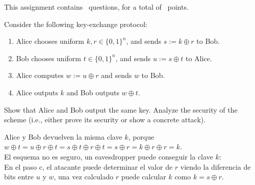 \documentclass[12pt,addpoints,answers]{exam}
\begin{document}
\noindent This assignment contains \numquestions\ questions,
for a total of \numpoints \ points.

\bigskip

\begin{questions}

\question[10] Consider the following key-exchange protocol:
\begin{enumerate}[label=(\alph*)]
    \item Alice chooses uniform $k,r\in\{0,1\}^n$, and sends $s:=k\oplus r$ to Bob.
    \item Bob chooses uniform $t\in\{0,1\}^n$, and sends $u:=s\oplus t$ to Alice.
    \item Alice computes $w:=u\oplus r$ and sends $w$ to Bob.
    \item Alice outputs $k$ and Bob outputs $w\oplus t$.
\end{enumerate}
Show that Alice and Bob output the same key. Analyze the security of the scheme (i.e., either prove its security or show a concrete attack).
\begin{solution}
    Alice y Bob devuelven la misma clave $k$, porque $w \oplus t = u \oplus r \oplus t = s \oplus t \oplus r \oplus t = s \oplus r = k \oplus r \oplus r = k$. \\ 
    El esquema no es seguro, un eavesdropper puede conseguir la clave $k$: \\ 
    En el paso c, el atacante puede determinar el valor de $r$ viendo la diferencia de bits entre $u$ y $w$, una vez calculado $r$ puede calcular $k$ como $k = s \oplus r$.
    
\end{solution}


\end{questions}
\end{document}
